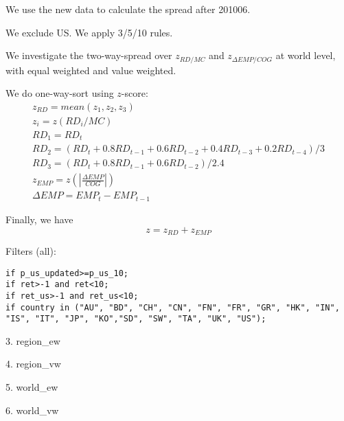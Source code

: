 

\usepackage[T1]{fontenc}




\thispagestyle{fancy}

\newcommand{\code}{\texttt}
\newcommand*{\Commonpath}{20190131/xUS-one-way-decile-big-201007}


We use the new data to calculate the spread after 201006.


We exclude US. 
We apply 3/5/10 rules.

We investigate the two-way-spread over $z_{RD/MC}$ and $z_{\Delta EMP/COG}$ at world level, with equal weighted and value weighted. 


We do one-way-sort using $z$-score:
$$
\begin{aligned}
& z_{RD} = mean(z_1, z_2, z_3) \\
& z_i = z(RD_i/MC) \\
& RD_1 = RD_t \\
& RD_2 = (RD_t + 0.8RD_{t-1} + 0.6RD_{t-2} + 0.4RD_{t-3} + 0.2RD_{t-4})/3 \\
& RD_3 = (RD_t + 0.8RD_{t-1} + 0.6RD_{t-2})/2.4 
& \\
& z_{EMP} = z(|\frac{\Delta EMP}{COG}|) \\
& \Delta EMP = EMP_t - EMP_{t-1}
\end{aligned}
$$

Finally, we have
$$
z = z_{RD} + z_{EMP}
$$


Filters (all):

\code{if p\_us\_updated>=p\_us\_10;} \\
\code{if ret>-1 and ret<10;} \\
\code{if ret\_us>-1 and ret\_us<10;} \\
\code{if country in ("AU", "BD", "CH", "CN", "FN", "FR", "GR", "HK", "IN", "IS", "IT", "JP", "KO","SD", "SW", "TA", "UK", "US");}


\small

% 

% 

3. region\_ew


4. region\_vw


5. world\_ew


6. world\_vw



